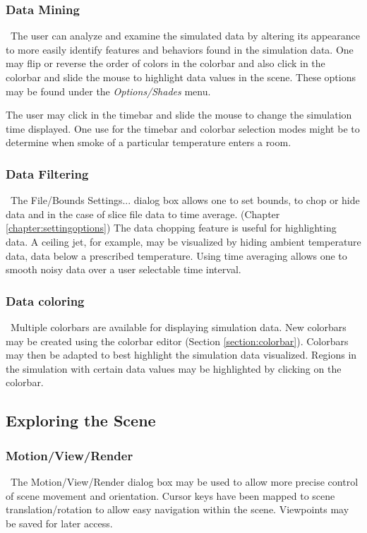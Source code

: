 \documentclass[11pt,twoside]{book}
\begin{document}
\subsubsection{Data Mining}\ The user can analyze and examine the simulated
data by altering its appearance to more easily identify features
and behaviors found in the simulation data. One may flip or
reverse the order of colors in the colorbar and also click in the
colorbar and slide the mouse to highlight data values in the
scene. These options may be found under the {\em Options/Shades}
menu.

The user may click in the timebar and slide the mouse to
change the simulation time displayed. One use for the timebar and colorbar selection modes might be to determine
when smoke of a particular temperature enters a room.

\subsubsection{Data Filtering}\ The File/Bounds Settings...
dialog box allows one to set bounds, to chop or hide data and in the case
of slice file data to time average. (Chapter \ref{chapter:settingoptions})
The data chopping
feature is useful for highlighting data.  A ceiling jet, for example,
may be visualized by hiding ambient temperature
data,  data below a prescribed temperature.
Using time averaging allows one to smooth noisy data over a user selectable time
interval.

\subsubsection{Data coloring}\ Multiple colorbars are available for displaying simulation data.
New colorbars may be created using the colorbar editor (Section \ref{section:colorbar}).
Colorbars may then be adapted to best highlight the simulation data visualized.
Regions in the simulation with certain data values may be highlighted by clicking
on the colorbar.

\subsection{Exploring the Scene}

\subsubsection{Motion/View/Render}\ The Motion/View/Render dialog box may be used to
allow more precise control of scene movement and orientation.
Cursor keys have been mapped to scene translation/rotation to
allow easy navigation within the scene.  Viewpoints may be saved for later access.
\end{document}
